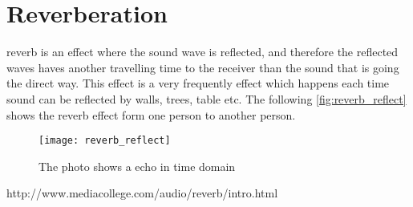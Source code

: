 \section{Reverberation}
\gls{reverb} is an effect where the sound wave is reflected, and therefore the reflected waves haves another travelling time to the receiver than the sound that is going the direct way. This effect is a very frequently effect which happens each time sound can be reflected by walls, trees, table etc. The following \autoref{fig:reverb_reflect} shows the \gls{reverb} effect form one person to another person.

\begin{figure} [htbp]
 \centering
  \texttt{[image: reverb\_reflect]}
  \caption{The photo shows a echo in time domain}
  \label{fig:reverb_reflect}
\end{figure}



http://www.mediacollege.com/audio/reverb/intro.html
